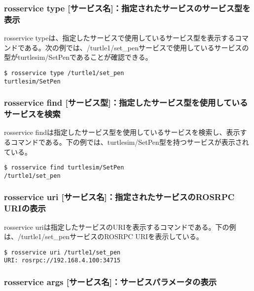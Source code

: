 \subsubsection{rosservice type [サービス名]：指定されたサービスのサービス型を表示}

rosservice typeは、指定したサービスで使用しているサービス型を表示するコマンドである。次の例では、/turtle1/set\_penサービスで使用しているサービスの型がturtlesim/SetPenであることが確認できる。

\begin{lstlisting}[language=ROS]
$ rosservice type /turtle1/set_pen
turtlesim/SetPen
\end{lstlisting}

\subsubsection{rosservice find [サービス型]：指定したサービス型を使用しているサービスを検索}

rosservice findは指定したサービス型を使用しているサービスを検索し、表示するコマンドである。下の例では、turtlesim/SetPen型を持つサービスが表示されている。

\begin{lstlisting}[language=ROS]
$ rosservice find turtlesim/SetPen
/turtle1/set_pen
\end{lstlisting}

\subsubsection{rosservice uri [サービス名]：指定されたサービスのROSRPC URIの表示}

rosservice uriは指定したサービスのURIを表示するコマンドである。下の例は、/turtle1/set\_penサービスのROSRPC URIを表示している。

\begin{lstlisting}[language=ROS]
$ rosservice uri /turtle1/set_pen
URI: rosrpc://192.168.4.100:34715
\end{lstlisting}

\subsubsection{rosservice args [サービス名]：サービスパラメータの表示}

